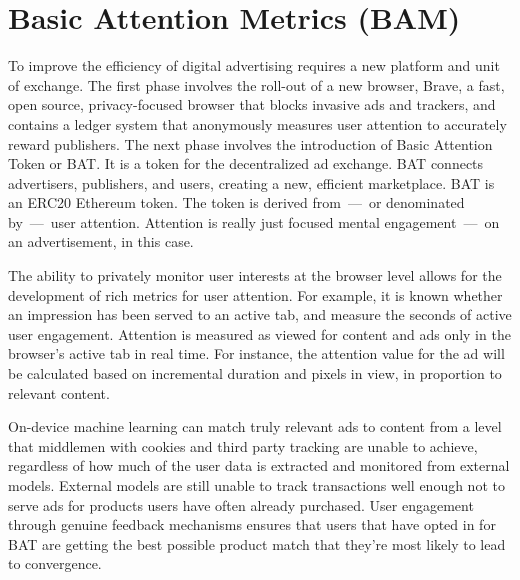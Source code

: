\documentclass[twocolumn,9pt]{article}
\newcommand{\bat}{\textsf{BAT}\xspace}
\begin{document}
\section{Basic Attention Metrics (BAM)}
\label{sec-4-1}

To improve the efficiency of digital advertising requires a new platform and unit of exchange. The first phase involves the roll-out of a new browser, Brave, a fast, open source, privacy-focused browser that blocks invasive ads and trackers, and contains a ledger system that anonymously measures user attention to accurately reward publishers. The next phase involves the introduction of Basic Attention Token or \bat. It is a token for the decentralized ad exchange. \bat connects advertisers, publishers, and users, creating a new, efficient marketplace. \bat is an ERC20 Ethereum token. The token is derived from~---~or denominated by~---~user attention. Attention is really just focused mental engagement~---~on an advertisement, in this case.

The ability to privately monitor user interests at the browser level allows for the development of rich metrics for user attention. For example, it is known whether an impression has been served to an active tab, and measure the seconds of active user engagement. Attention is measured as viewed for content and ads only in the browser's active tab in real time. For instance, the attention value for the ad will be calculated based on incremental duration and pixels in view, in proportion to relevant content. %

On-device machine learning can match truly relevant ads to content from a level that middlemen with cookies and third party tracking are unable to achieve, regardless of how much of the user data is extracted and monitored from external models. External models are still unable to track transactions well enough not to serve ads for products users have often already purchased. User engagement through genuine feedback mechanisms ensures that users that have opted in for \bat are getting the best possible product match that they're most likely to lead to convergence. %
\end{document}
